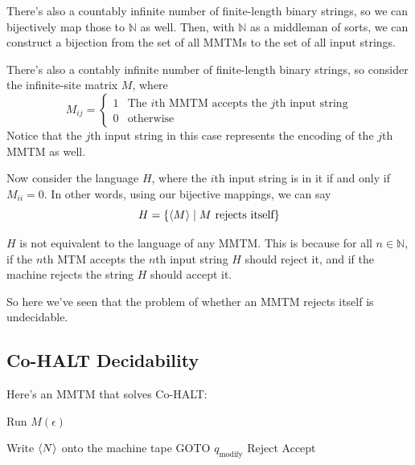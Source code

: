 \documentclass[12pt]{article}
\newcommand{\N}{\mathbb{N}}
\begin{document}
There's also a countably infinite number of finite-length binary strings,
so we can bijectively map those to $\N$ as well.
Then, with $\N$ as a middleman of sorts, we can construct a bijection
from the set of all MMTMs to the set of all input strings.

There's also a contably infinite number of finite-length binary strings, so consider
the infinite-site matrix $M$, where
\[M_{ij}=\begin{cases}
    1 & \text{The $i$th MMTM accepts the $j$th input string} \\
    0 & \text{otherwise}
\end{cases}\]
Notice that the $j$th input string in this case represents the encoding of the $j$th MMTM as well.

Now consider the language $H$, where the $i$th input string is in it if and only if $M_{ii}=0$.
In other words, using our bijective mappings, we can say
\[H=\{\braket{M} \mid \text{$M$ rejects itself}\}\]

$H$ is not equivalent to the language of any MMTM.
This is because for all $n \in \N$, if the $n$th MTM accepts the $n$th input string
$H$ should reject it, and if the machine rejects the string $H$ should accept it.

So here we've seen that the problem of whether an MMTM rejects itself is undecidable.

\pagebreak

\subsection{Co-HALT Decidability}

Here's an MMTM that solves Co-HALT:
\begin{algorithmic}[1]
            \State Run $M(\epsilon)$
        \EndProcedure

        \item[]
        \State Write $\Braket{N}$ onto the machine tape
        \State GOTO $q_{\text{modify}}$
            \State Reject
            \State Accept
        \EndIf
    \EndProcedure
\end{algorithmic}

\pagebreak
\end{document}
